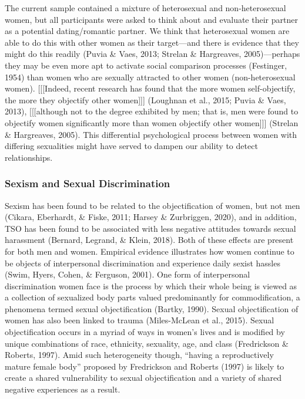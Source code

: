\documentclass[man]{apa6}
\begin{document}
The current sample contained a mixture of heterosexual and
non-heterosexual women, but all participants were asked to think about
and evaluate their partner as a potential dating/romantic partner. We
think that heterosexual women are able to do this with other women as
their target---and there is evidence that they might do this readily
(Puvia \& Vaes, 2013; Strelan \& Hargreaves, 2005)---perhaps they may be
even more apt to activate social comparison processes (Festinger, 1954)
than women who are sexually attracted to other women (non-heterosexual
women). {[}{[}{[}Indeed, recent research has found that the more women
self-objectify, the more they objectify other women{]}{]}{]} (Loughnan
et al., 2015; Puvia \& Vaes, 2013), {[}{[}{[}although not to the degree
exhibited by men; that is, men were found to objectify women
significantly more than women objectify other women{]}{]}{]} (Strelan \&
Hargreaves, 2005). This differential psychological process between women
with differing sexualities might have served to dampen our ability to
detect relationships.

\subsubsection{Sexism and Sexual
Discrimination}\label{sexism-and-sexual-discrimination}

Sexism has been found to be related to the objectification of women, but
not men (Cikara, Eberhardt, \& Fiske, 2011; Harsey \& Zurbriggen, 2020),
and in addition, TSO has been found to be associated with less negative
attitudes towards sexual harassment (Bernard, Legrand, \& Klein, 2018).
Both of these effects are present for both men and women. Empirical
evidence illustrates how women continue to be objects of interpersonal
discrimination and experience daily sexist hassles (Swim, Hyers, Cohen,
\& Ferguson, 2001). One form of interpersonal discrimination women face
is the process by which their whole being is viewed as a collection of
sexualized body parts valued predominantly for commodification, a
phenomena termed sexual objectification (Bartky, 1990). Sexual
objectification of women has also been linked to trauma (Miles-McLean et
al., 2015). Sexual objectification occurs in a myriad of ways in women's
lives and is modified by unique combinations of race, ethnicity,
sexuality, age, and class (Fredrickson \& Roberts, 1997). Amid such
heterogeneity though, \enquote{having a reproductively mature female
body} proposed by Fredrickson and Roberts (1997) is likely to create a
shared vulnerability to sexual objectification and a variety of shared
negative experiences as a result.
\end{document}
